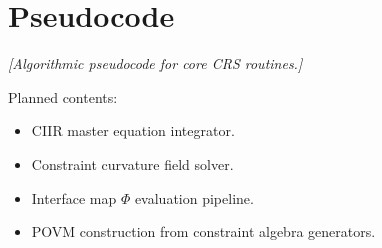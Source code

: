 \documentclass[11pt,a4paper,openany]{book}
\theoremstyle{remark}
\begin{document}
\chapter{Pseudocode}
\label{app:pseudocode}

\begin{center}
\emph{[Algorithmic pseudocode for core CRS routines.]}
\end{center}

\noindent
Planned contents:
\begin{itemize}[nosep]
  \item CIIR master equation integrator.
  \item Constraint curvature field solver.
  \item Interface map $\Phi$ evaluation pipeline.
  \item POVM construction from constraint algebra generators.
\end{itemize}






\end{document}
